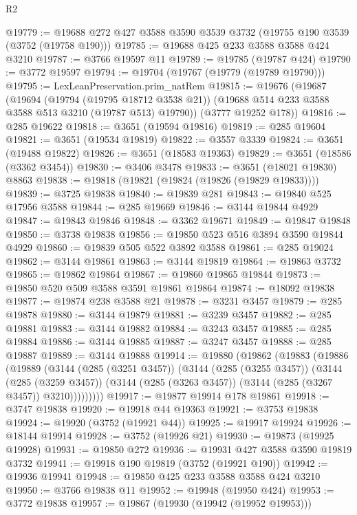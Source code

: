 \begin{lexlean}{R2}
\begin{coremodule}
@19779 := @19688 @272 @427 @3588 @3590 @3539 @3732 (@19755 @190 @3539 (@3752 (@19758 @190)))
@19785 := @19688 @425 @233 @3588 @3588 @424 @3210
@19787 := @3766 @19597 @11
@19789 := @19785 (@19787 @424)
@19790 := @3772 @19597
@19794 := @19704 (@19767 (@19779 (@19789 @19790)))
@19795 := LexLeanPreservation.prim_natRem
@19815 := @19676
    (@19687
      (@19694
        (@19794 (@19795 @18712 @3538 @21))
        (@19688 @514 @233 @3588 @3588 @513 @3210 (@19787 @513) @19790))
      (@3777 @19252 @178))
@19816 := @285 @19622
@19818 := @3651 (@19594 @19816)
@19819 := @285 @19604
@19821 := @3651 (@19534 @19819)
@19822 := @3557 @3339
@19824 := @3651 (@19488 @19822)
@19826 := @3651 (@18583 @19363)
@19829 := @3651 (@18586 (@3362 @3454))
@19830 := @3406 @3478
@19833 := @3651 (@18021 @19830) @8863
@19838 := @19818 (@19821 (@19824 (@19826 (@19829 @19833))))
@19839 := @3725 @19838
@19840 := @19839 @281
@19843 := @19840 @525 @17956 @3588
@19844 := @285 @19669
@19846 := @3144 @19844 @4929
@19847 := @19843 @19846
@19848 := @3362 @19671
@19849 := @19847 @19848
@19850 := @3738 @19838
@19856 := @19850 @523 @516 @3894 @3590 @19844 @4929
@19860 := @19839 @505 @522 @3892 @3588
@19861 := @285 @19024
@19862 := @3144 @19861
@19863 := @3144 @19819
@19864 := @19863 @3732
@19865 := @19862 @19864
@19867 := @19860 @19865 @19844
@19873 := @19850 @520 @509 @3588 @3591 @19861 @19864
@19874 := @18092 @19838
@19877 := @19874 @238 @3588 @21
@19878 := @3231 @3457
@19879 := @285 @19878
@19880 := @3144 @19879
@19881 := @3239 @3457
@19882 := @285 @19881
@19883 := @3144 @19882
@19884 := @3243 @3457
@19885 := @285 @19884
@19886 := @3144 @19885
@19887 := @3247 @3457
@19888 := @285 @19887
@19889 := @3144 @19888
@19914 := @19880
    (@19862
      (@19883
        (@19886
          (@19889
            (@3144
              (@285 (@3251 @3457))
              (@3144
                (@285 (@3255 @3457))
                (@3144
                  (@285 (@3259 @3457))
                  (@3144 (@285 (@3263 @3457)) (@3144 (@285 (@3267 @3457)) @3210)))))))))
@19917 := @19877 @19914 @178 @19861
@19918 := @3747 @19838
@19920 := @19918 @44 @19363
@19921 := @3753 @19838
@19924 := @19920 (@3752 (@19921 @44))
@19925 := @19917 @19924
@19926 := @18144 @19914
@19928 := @3752 (@19926 @21)
@19930 := @19873 (@19925 @19928)
@19931 := @19850 @272
@19936 := @19931 @427 @3588 @3590 @19819 @3732
@19941 := @19918 @190 @19819 (@3752 (@19921 @190))
@19942 := @19936 @19941
@19948 := @19850 @425 @233 @3588 @3588 @424 @3210
@19950 := @3766 @19838 @11
@19952 := @19948 (@19950 @424)
@19953 := @3772 @19838
@19957 := @19867 (@19930 (@19942 (@19952 @19953)))

\end{coremodule}
\end{lexlean}
